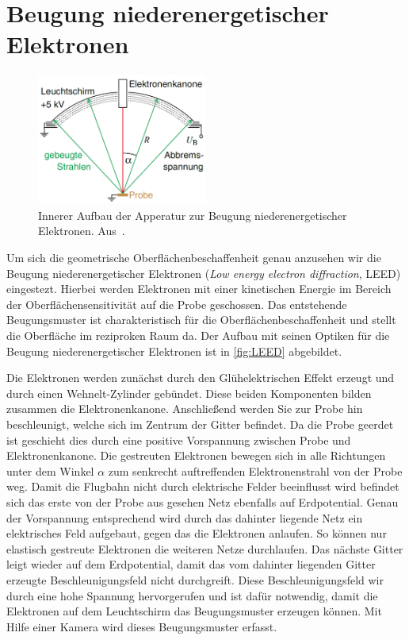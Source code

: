     \section{Beugung niederenergetischer Elektronen} \label{sec:LEED}
        \begin{figure}
            \centering
            \includegraphics[width=0.5\textwidth]{./content/LEED}
            \caption{Innerer Aufbau der Apperatur zur Beugung niederenergetischer Elektronen. Aus~\cite{Fauster}.}
            \label{fig:LEED}
        \end{figure}
        Um sich die geometrische Oberflächenbeschaffenheit genau anzusehen wir die Beugung niederenergetischer Elektronen (\textit{Low energy electron diffraction}, LEED) eingestezt.
        Hierbei werden Elektronen mit einer kinetischen Energie im Bereich der Oberflächensensitivität auf die Probe geschossen.
        Das entstehende Beugungsmuster ist charakteristisch für die Oberflächenbeschaffenheit und stellt die Oberfläche im reziproken Raum da.
        Der Aufbau mit seinen Optiken für die Beugung niederenergetischer Elektronen ist in \autoref{fig:LEED} abgebildet.
        
        Die Elektronen werden zunächst durch den Glühelektrischen Effekt erzeugt und durch einen Wehnelt-Zylinder gebündet.
        Diese beiden Komponenten bilden zusammen die Elektronenkanone.
        Anschließend werden Sie zur Probe hin beschleunigt, welche sich im Zentrum der Gitter befindet.
        Da die Probe geerdet ist geschieht dies durch eine positive Vorspannung zwischen Probe und Elektronenkanone.
        Die gestreuten Elektronen bewegen sich in alle Richtungen unter dem Winkel $\alpha$ zum senkrecht auftreffenden Elektronenstrahl von der Probe weg.
        Damit die Flugbahn nicht durch elektrische Felder beeinflusst wird befindet sich das erste von der Probe aus gesehen Netz ebenfalls auf Erdpotential.
        Genau der Vorspannung entsprechend wird durch das dahinter liegende Netz  ein elektrisches Feld aufgebaut, gegen das die Elektronen anlaufen.
        So können nur elastisch gestreute Elektronen die weiteren Netze durchlaufen.
        Das nächste Gitter leigt wieder auf dem Erdpotential, damit das vom dahinter liegenden Gitter erzeugte Beschleunigungsfeld nicht durchgreift.
        Diese Beschleunigungsfeld wir durch eine hohe Spannung hervorgerufen und ist dafür notwendig, damit die Elektronen auf dem Leuchtschirm das Beugungsmuster erzeugen können.
        Mit Hilfe einer Kamera wird dieses Beugungsmuster erfasst.

